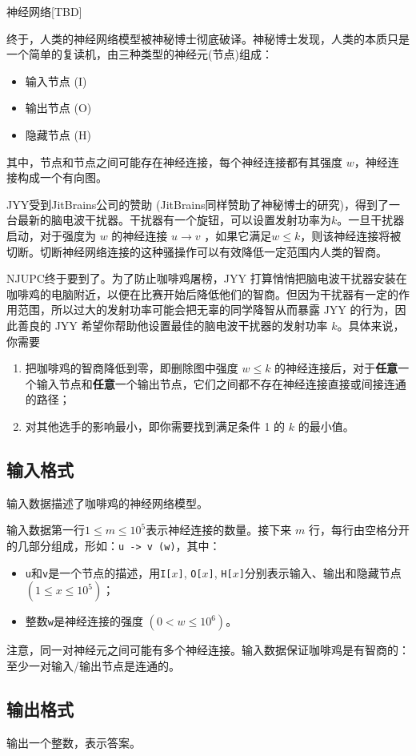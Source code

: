 \begin{Problem}{神经网络}{[TBD]}

终于，人类的神经网络模型被神秘博士彻底破译。神秘博士发现，人类的本质只是一个简单的复读机，由三种类型的神经元(节点)组成：

\begin{itemize}
\item 输入节点 (I)
\item 输出节点 (O)
\item 隐藏节点 (H)
\end{itemize}

其中，节点和节点之间可能存在神经连接，每个神经连接都有其强度 $w$，神经连接构成一个有向图。

JYY受到JitBrains公司的赞助 (JitBrains同样赞助了神秘博士的研究)，得到了一台最新的脑电波干扰器。干扰器有一个旋钮，可以设置发射功率为$k$。一旦干扰器启动，对于强度为 $w$ 的神经连接 $u \to v$ ，如果它满足$w \le k$，则该神经连接将被切断。切断神经网络连接的这种骚操作可以有效降低一定范围内人类的智商。

NJUPC终于要到了。为了防止咖啡鸡屠榜，JYY 打算悄悄把脑电波干扰器安装在咖啡鸡的电脑附近，以便在比赛开始后降低他们的智商。但因为干扰器有一定的作用范围，所以过大的发射功率可能会把无辜的同学降智从而暴露 JYY 的行为，因此善良的 JYY 希望你帮助他设置最佳的脑电波干扰器的发射功率 $k$。具体来说，你需要

\begin{enumerate}
\item 把咖啡鸡的智商降低到零，即删除图中强度 $w \le k$ 的神经连接后，对于\textbf{任意}一个输入节点和\textbf{任意}一个输出节点，它们之间都不存在神经连接直接或间接连通的路径；
\item 对其他选手的影响最小，即你需要找到满足条件 1 的 $k$ 的最小值。
\end{enumerate}

\subsection*{输入格式}

输入数据描述了咖啡鸡的神经网络模型。

输入数据第一行$1\le m \le 10^5$表示神经连接的数量。接下来 $m$ 行，每行由空格分开的几部分组成，形如：\texttt{u -> v (w)}，其中：

\begin{itemize}
\item \texttt{u}和\texttt{v}是一个节点的描述，用\texttt{I[$x$]}, \texttt{O[$x$]}, \texttt{H[$x$]}分别表示输入、输出和隐藏节点 $(1 \le x \le 10^5)$；
\item 整数\texttt{w}是神经连接的强度 $(0 < w \le 10^6)$。
\end{itemize}

注意，同一对神经元之间可能有多个神经连接。输入数据保证咖啡鸡是有智商的：至少一对输入/输出节点是连通的。

\subsection*{输出格式}

输出一个整数，表示答案。

\setcounter{ExampleNo}{0}


\end{Problem}
